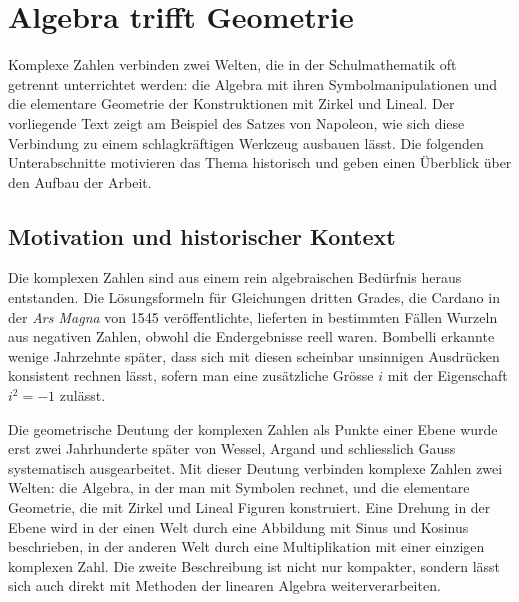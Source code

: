 %
%
\section{Algebra trifft Geometrie
\label{komplex:section:einleitung}}
Komplexe Zahlen verbinden zwei Welten, die in der Schulmathematik
oft getrennt unterrichtet werden:
die Algebra mit ihren Symbolmanipulationen
und die elementare Geometrie der Konstruktionen mit Zirkel und Lineal.
%
%
%
Der vorliegende Text zeigt am Beispiel des Satzes von Napoleon,
%
wie sich diese Verbindung zu einem schlagkräftigen Werkzeug ausbauen lässt.
Die folgenden Unterabschnitte motivieren das Thema historisch
und geben einen Überblick über den Aufbau der Arbeit.

%
%
\subsection{Motivation und historischer Kontext
\label{komplex:subsection:motivation}}
Die komplexen Zahlen sind aus einem rein algebraischen Bedürfnis heraus
entstanden.
Die Lösungsformeln für Gleichungen dritten Grades, die Cardano in der
%
\emph{Ars Magna} von 1545 veröffentlichte,
%
lieferten in bestimmten Fällen Wurzeln aus negativen Zahlen,
obwohl die Endergebnisse reell waren.
Bombelli erkannte wenige Jahrzehnte später,
dass sich mit diesen scheinbar unsinnigen Ausdrücken konsistent rechnen lässt,
sofern man eine zusätzliche Grösse $i$ mit der Eigenschaft $i^2 = -1$ zulässt.

Die geometrische Deutung der komplexen Zahlen als Punkte einer Ebene
wurde erst zwei Jahrhunderte später von Wessel, Argand und schliesslich
Gauss systematisch ausgearbeitet.
%
%
%
Mit dieser Deutung verbinden komplexe Zahlen zwei Welten:
die Algebra, in der man mit Symbolen rechnet,
und die elementare Geometrie, die mit Zirkel und Lineal Figuren konstruiert.
Eine Drehung in der Ebene wird in der einen Welt durch eine Abbildung
mit Sinus und Kosinus beschrieben,
in der anderen Welt durch eine Multiplikation mit einer einzigen
komplexen Zahl.
Die zweite Beschreibung ist nicht nur kompakter,
sondern lässt sich auch direkt mit Methoden der linearen Algebra
weiterverarbeiten.

